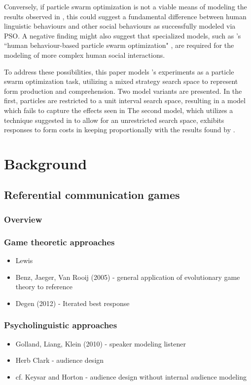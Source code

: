 \documentclass[12pt,a4paper]{article}
\begin{document}
Conversely, if particle swarm optimization is not a viable means of modeling the results observed in \citeauthor{rohde2012}, this could suggest a fundamental difference between human linguistic behaviours and other social behaviours as successfully modeled via PSO. A negative finding might also suggest that specialized models, such as \citeauthor{liu2014}'s ``human behaviour-based particle swarm optimization" \citeyearpar{liu2014}, are required for the modeling of more complex human social interactions.

To address these possibilities, this paper models \citeauthor{rohde2012}'s experiments as a particle swarm optimization task, utilizing a mixed strategy search space to represent form production and comprehension. Two model variants are presented. In the first, particles are restricted to a unit interval search space, resulting in a model which fails to capture the effects seen in \citeauthor{rohde2012} The second model, which utilizes a technique suggested in \citealt[p.~252]{engelbrecht2005} to allow for an unrestricted search space, exhibits responses to form costs in keeping proportionally with the results found by \citeauthor{rohde2012}.



\section{Background}
\subsection{Referential communication games}
\subsubsection{Overview}
\subsubsection{Game theoretic approaches}
\begin{itemize}
\item Lewis

\item Benz, Jaeger, Van Rooij (2005) - general application of evolutionary game theory to reference

\item Degen (2012) - Iterated best response
\end{itemize}
\subsubsection{Psycholinguistic approaches}
\begin{itemize}
\item Golland, Liang, Klein (2010) - speaker modeling listener
\item Herb Clark - audience design
\item cf. Keysar and Horton - audience design without internal audience modeling
\end{itemize}
\end{document}
